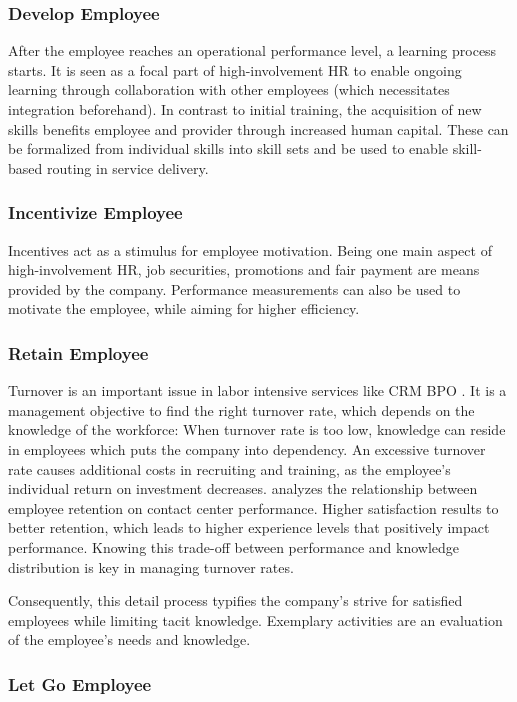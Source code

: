 	\subsubsection{Develop Employee}
		After the employee reaches an operational performance level, a learning process starts. It is seen as a focal part of high-involvement HR to enable ongoing learning through collaboration with other employees \citep{Batt2002} (which necessitates integration beforehand). In contrast to initial training, the acquisition of new skills benefits  employee and provider through increased human capital. These can be formalized from individual skills into skill sets and be used to enable skill-based routing in service delivery. 
	\subsubsection{Incentivize Employee}
		Incentives act as a stimulus for employee motivation. Being one main aspect of high-involvement HR, job securities, promotions and fair payment are means provided by the company. Performance measurements can also be used to motivate the employee, while aiming for higher efficiency. 
	\subsubsection{Retain Employee}
	
	Turnover is an important issue in labor intensive services like \acrshort{CRM} \acrshort{BPO} \citep[]{gross2006}. It is a management objective to find the right turnover rate, which depends on the knowledge of the workforce: When turnover rate is too low, knowledge can reside in employees which puts the company into dependency. An excessive turnover rate causes additional costs in recruiting and training, as the employee's individual return on investment decreases. \cite{Whitt2006} analyzes the relationship between employee retention on contact center performance. Higher satisfaction results to better retention, which leads to higher experience levels that positively impact performance. Knowing this trade-off  between performance and knowledge distribution is key in managing turnover rates.
	
	Consequently, this detail process typifies the company's strive for satisfied employees while limiting tacit knowledge. Exemplary activities are an evaluation of the employee's needs and knowledge. 
	
	\subsubsection{Let Go Employee}
	
